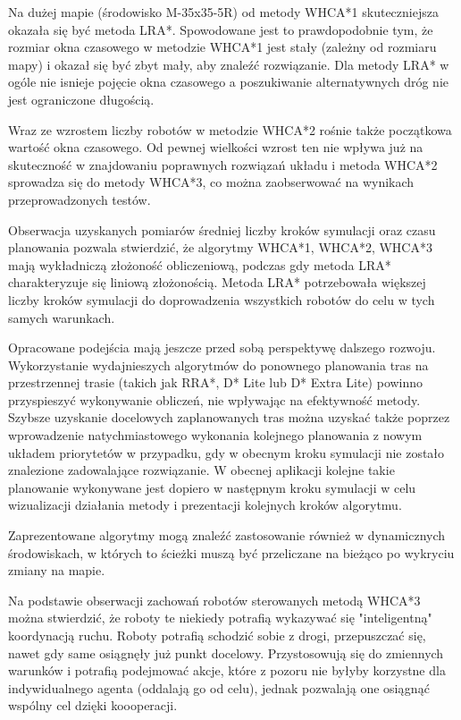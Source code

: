 Na dużej mapie (środowisko M-35x35-5R) od metody WHCA*1 skuteczniejsza okazała się być metoda LRA*. Spowodowane jest to prawdopodobnie tym, że rozmiar okna czasowego w metodzie WHCA*1 jest stały (zależny od rozmiaru mapy) i okazał się być zbyt mały, aby znaleźć rozwiązanie. Dla metody LRA* w ogóle nie isnieje pojęcie okna czasowego a poszukiwanie alternatywnych dróg nie jest ograniczone długością.

Wraz ze wzrostem liczby robotów w metodzie WHCA*2 rośnie także początkowa wartość okna czasowego.
Od pewnej wielkości wzrost ten nie wpływa już na skuteczność w znajdowaniu poprawnych rozwiązań układu i metoda WHCA*2 sprowadza się do metody WHCA*3, co można zaobserwować na wynikach przeprowadzonych testów.

Obserwacja uzyskanych pomiarów średniej liczby kroków symulacji oraz czasu planowania pozwala stwierdzić, że algorytmy WHCA*1, WHCA*2, WHCA*3 mają wykładniczą złożoność obliczeniową, podczas gdy metoda LRA* charakteryzuje się liniową złożonością.
Metoda LRA* potrzebowała większej liczby kroków symulacji do doprowadzenia wszystkich robotów do celu w tych samych warunkach.


Opracowane podejścia mają jeszcze przed sobą perspektywę dalszego rozwoju.
Wykorzystanie wydajnieszych algorytmów do ponownego planowania tras na przestrzennej trasie (takich jak RRA*, D* Lite lub D* Extra Lite) powinno przyspieszyć wykonywanie obliczeń, nie wpływając na efektywność metody.
Szybsze uzyskanie docelowych zaplanowanych tras można uzyskać także poprzez wprowadzenie natychmiastowego wykonania kolejnego planowania z nowym układem priorytetów w przypadku, gdy w obecnym kroku symulacji nie zostało znalezione zadowalające rozwiązanie.
W obecnej aplikacji kolejne takie planowanie wykonywane jest dopiero w następnym kroku symulacji w celu wizualizacji działania metody i prezentacji kolejnych kroków algorytmu.

Zaprezentowane algorytmy mogą znaleźć zastosowanie również w dynamicznych środowiskach, w których to ścieżki muszą być przeliczane na bieżąco po wykryciu zmiany na mapie.

Na podstawie obserwacji zachowań robotów sterowanych metodą WHCA*3 można stwierdzić, że roboty te niekiedy potrafią wykazywać się "inteligentną" koordynacją ruchu.
Roboty potrafią schodzić sobie z drogi, przepuszczać się, nawet gdy same osiągnęły już punkt docelowy.
Przystosowują się do zmiennych warunków i potrafią podejmować akcje, które z pozoru nie byłyby korzystne dla indywidualnego agenta (oddalają go od celu), jednak pozwalają one osiągnąć wspólny cel dzięki koooperacji.

